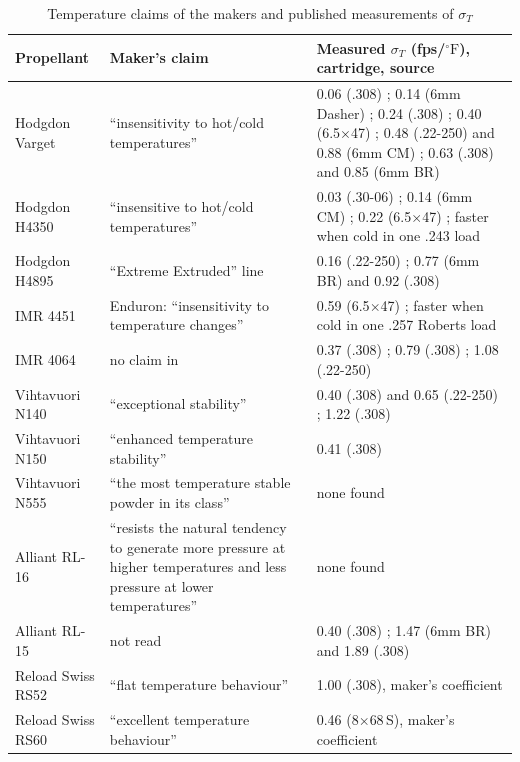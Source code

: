 \documentclass[11pt,twoside,openright]{report}
\newcommand{\degF}{\ensuremath{{}^{\circ}\mathrm{F}}}
\begin{document}
\begin{table}[H]
\centering
\caption{Temperature claims of the makers and published measurements of $\sigma_T$}
\label{tab:propellants}
\small
\begin{tabularx}{\textwidth}{@{}lXX@{}}
\toprule
\textbf{Propellant} & \textbf{Maker's claim} & \textbf{Measured $\sigma_T$ (fps/$\degF$), cartridge, source} \\
\midrule
Hodgdon Varget & ``insensitivity to hot/cold temperatures'' \citep{hodgdon2024} & 0.06 (.308) \citep{hodgdon2012extreme}; 0.14 (6mm Dasher) \citep{zant2025temp}; 0.24 (.308) \citep{gear2022temp}; 0.40 (6.5$\times$47) \citep{zant2016powder}; 0.48 (.22-250) and 0.88 (6mm CM) \citep{haviland2022temp}; 0.63 (.308) and 0.85 (6mm BR) \citep{castleman2022t308,castleman2022t6br} \\
Hodgdon H4350 & ``insensitive to hot/cold temperatures'' \citep{hodgdon2024} & 0.03 (.30-06) \citep{hodgdon2012extreme}; 0.14 (6mm CM) \citep{zant2025temp}; 0.22 (6.5$\times$47) \citep{zant2016powder}; faster when cold in one .243 load \citep{barsness2017temp} \\
Hodgdon H4895 & ``Extreme Extruded'' line \citep{hodgdon2024} & 0.16 (.22-250) \citep{hodgdon2012extreme}; 0.77 (6mm BR) and 0.92 (.308) \citep{castleman2022t6br,castleman2022t308} \\
IMR 4451 & Enduron: ``insensitivity to temperature changes'' \citep{hodgdon2024} & 0.59 (6.5$\times$47) \citep{zant2016powder}; faster when cold in one .257 Roberts load \citep{barsness2017temp} \\
IMR 4064 & no claim in \citet{hodgdon2024} & 0.37 (.308) \citep{hodgdon2012extreme}; 0.79 (.308) \citep{castleman2022t308}; 1.08 (.22-250) \citep{haviland2022temp} \\
Vihtavuori N140 & ``exceptional stability'' \citep{vihtavuori2026} & 0.40 (.308) and 0.65 (.22-250) \citep{hodgdon2012extreme}; 1.22 (.308) \citep{castleman2022t308} \\
Vihtavuori N150 & ``enhanced temperature stability'' \citep{vihtavuori2026} & 0.41 (.308) \citep{castleman2022t308} \\
Vihtavuori N555 & ``the most temperature stable powder in its class'' \citep{vihtavuori2026} & none found \\
Alliant RL-16 & ``resists the natural tendency to generate more pressure at higher temperatures and less pressure at lower temperatures'' \citep{alliant_rl16} & none found \\
Alliant RL-15 & not read & 0.40 (.308) \citep{hodgdon2012extreme}; 1.47 (6mm BR) and 1.89 (.308) \citep{castleman2022t6br,castleman2022t308} \\
Reload Swiss RS52 & ``flat temperature behaviour'' \citep{reloadswiss2025} & 1.00 (.308), maker's coefficient \citep{reloadswiss2019temp} \\
Reload Swiss RS60 & ``excellent temperature behaviour'' \citep{reloadswiss2025} & 0.46 (8$\times$68\,S), maker's coefficient \citep{reloadswiss2019temp} \\
\bottomrule
\end{tabularx}
\end{table}
\end{document}
